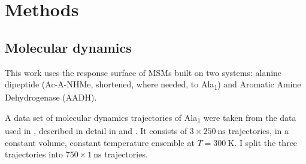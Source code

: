 



\section{Methods}\label{sec:methods}
\subsection{Molecular dynamics}
This work uses the response surface of MSMs built on two systems: alanine dipeptide (Ac-A-NHMe, shortened, where needed, to Ala\textsubscript{1}) and Aromatic Amine Dehydrogenase (AADH). 

 A data set of molecular dynamics trajectories of Ala\textsubscript{1} were taken from the data used in \cite{wehmeyerTimelaggedAutoencodersDeep2018a}, described in detail in \cite{nuskeMarkovStateModels2017b} and \cite{harveyACEMDAcceleratingBiomolecular2009}.  It consists of $3\times \SI{250}{\nano\second}$ trajectories, in a constant volume, constant temperature ensemble at $T=\SI{300}{\kelvin}$. I split the three trajectories into $750\times\SI{1}{\nano\second}$ trajectories. 
 
